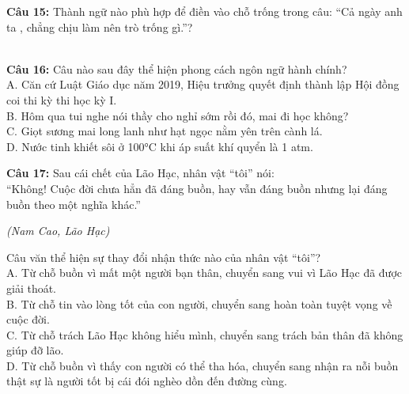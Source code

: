 \documentclass[12pt,a4paper]{article}
\begin{document}


\vspace{0.3cm}

\noindent \textbf{Câu 15:} Thành ngữ nào phù hợp để điền vào chỗ trống trong câu: ``Cả ngày anh ta \underline{\hspace{1.5cm}}, chẳng chịu làm nên trò trống gì.''?\\
\noindent{}\\
\noindent{}



\vspace{0.3cm}

\noindent \textbf{Câu 16:} Câu nào sau đây thể hiện phong cách ngôn ngữ hành chính?\\
\noindent A. Căn cứ Luật Giáo dục năm 2019, Hiệu trưởng quyết định thành lập Hội đồng coi thi kỳ thi học kỳ I.\\
\noindent B. Hôm qua tui nghe nói thầy cho nghỉ sớm rồi đó, mai đi học không?\\
\noindent C. Giọt sương mai long lanh như hạt ngọc nằm yên trên cành lá.\\
\noindent D. Nước tinh khiết sôi ở 100°C khi áp suất khí quyển là 1 atm.



\vspace{0.3cm}

\noindent \textbf{Câu 17:} Sau cái chết của Lão Hạc, nhân vật ``tôi'' nói:\\
``Không! Cuộc đời chưa hẳn đã đáng buồn, hay vẫn đáng buồn nhưng lại đáng buồn theo một nghĩa khác.''
\begin{flushright}\small\textit{(Nam Cao, Lão Hạc)}\end{flushright}
Câu văn thể hiện sự thay đổi nhận thức nào của nhân vật ``tôi''?\\
\noindent A. Từ chỗ buồn vì mất một người bạn thân, chuyển sang vui vì Lão Hạc đã được giải thoát.\\
\noindent B. Từ chỗ tin vào lòng tốt của con người, chuyển sang hoàn toàn tuyệt vọng về cuộc đời.\\
\noindent C. Từ chỗ trách Lão Hạc không hiểu mình, chuyển sang trách bản thân đã không giúp đỡ lão.\\
\noindent D. Từ chỗ buồn vì thấy con người có thể tha hóa, chuyển sang nhận ra nỗi buồn thật sự là người tốt bị cái đói nghèo dồn đến đường cùng.
\end{document}
